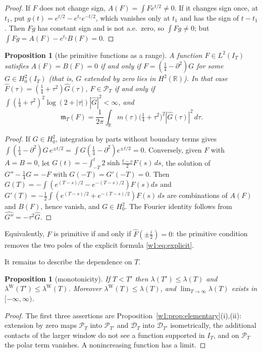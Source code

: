 \documentclass[11pt]{amsart}
\newtheorem{proposition}[theorem]{Proposition}
\theoremstyle{definition}
\theoremstyle{remark}
\numberwithin{equation}{section}
\newcommand{\R}{\mathbb{R}}
\newcommand{\IT}{I_T}                                  %
\newcommand{\Fh}{\widehat F}                           %
\newcommand{\PT}{\mathcal{P}_T}                        %
\newcommand{\DT}{\mathcal{D}_T}                        %
\newcommand{\mT}{\mathfrak{m}_T}                       %
\newcommand{\lam}{\lambda(T)}                          %
\newcommand{\lamW}{\lambda^{\mathrm W}(T)}             %
\begin{document}
\begin{proof}
If $F$ does not change sign, $A(F)=\int Fe^{t/2}\ne0$. If it changes sign once, at $t_1$, put
$g(t)=e^{t/2}-e^{t_1}e^{-t/2}$, which vanishes only at $t_1$ and has the sign of $t-t_1$. Then $Fg$ has constant sign
and is not a.e.\ zero, so $\int Fg\ne0$; but $\int Fg=A(F)-e^{t_1}B(F)=0$.
\end{proof}

\begin{proposition}[the primitive functions as a range]\label{w2:prop:range}
A function $F\in L^2(\IT)$ satisfies $A(F)=B(F)=0$ if and only if $F=(\frac14-\partial^2)G$ for some $G\in H^2_0(\IT)$
(that is, $G$ extended by zero lies in $H^2(\R)$). In that case $\Fh(\tau)=(\frac14+\tau^2)\widehat G(\tau)$, $F\in\PT$
if and only if $\int(\frac14+\tau^2)^2\log(2+|\tau|)|\widehat G|^2<\infty$, and
\[
\mT(F)=\frac1{2\pi}\int_\R m(\tau)\bigl(\tfrac14+\tau^2\bigr)^2|\widehat G(\tau)|^2\,d\tau .
\]
\end{proposition}

\begin{proof}
If $G\in H^2_0$, integration by parts without boundary terms gives
$\int(\frac14-\partial^2)G\,e^{\pm t/2}=\int G(\frac14-\partial^2)e^{\pm t/2}=0$. Conversely, given $F$ with $A=B=0$,
let $G(t)=-\int_{-T}^t2\sinh\frac{t-s}2F(s)\,ds$, the solution of $G''-\frac14G=-F$ with $G(-T)=G'(-T)=0$. Then
$G(T)=-\int(e^{(T-s)/2}-e^{-(T-s)/2})F(s)ds$ and $G'(T)=-\frac12\int(e^{(T-s)/2}+e^{-(T-s)/2})F(s)\,ds$ are combinations of
$A(F)$ and $B(F)$, hence vanish, and $G\in H^2_0$. The Fourier identity follows from $\widehat{G''}=-\tau^2\widehat G$.
\end{proof}

Equivalently, $F$ is primitive if and only if $\Fh(\pm\frac i2)=0$: the primitive condition removes the two poles of the
explicit formula \eqref{w1:eq:explicit}.

It remains to describe the dependence on $T$.

\begin{proposition}[monotonicity]\label{w2:prop:monotone}
If $T<T'$ then $\lambda(T')\le\lambda(T)$ and $\lambda^{\mathrm W}(T')\le\lambda^{\mathrm W}(T)$. Moreover
$\lamW\le\lam$, and $\lim_{T\to\infty}\lam$ exists in $[-\infty,\infty)$.
\end{proposition}

\begin{proof}
The first three assertions are Proposition~\ref{w1:prop:elementary}(i),(ii): extension by zero maps $\PT$ into
$\mathcal P_{T'}$ and $\DT$ into $\mathcal D_{T'}$ isometrically, the additional contacts of the larger window do not
see a function supported in $\IT$, and on $\PT$ the polar term vanishes. A nonincreasing function has a limit.
\end{proof}
\end{document}
